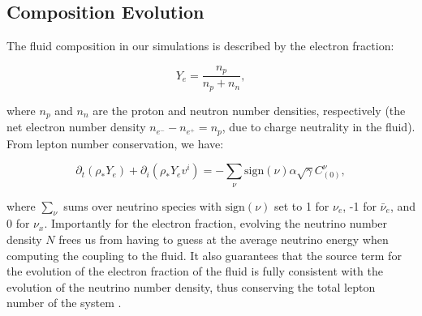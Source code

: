 \subsection{Composition Evolution}

The fluid composition in our simulations is described by the electron fraction:

\begin{equation}
  Y_e = \frac{n_p}{n_p + n_n},
\end{equation}

where $n_p$ and $n_n$ are the proton and neutron number densities, respectively (the net electron number density $n_{e^{-}} - n_{e^{+}} = n_p$, due to charge neutrality in the fluid). From lepton number conservation, we have:

\begin{equation}
  \partial_t \left(\rho_* Y_e \right) + \partial_i\left(\rho_*Y_e v^i\right)= -\sum_{\nu}\textrm{sign}(\nu)\alpha \sqrt{\gamma} C^{\nu}_{(0)},
\end{equation}

where $\sum_{\nu}$ sums over neutrino species with $\textrm{sign}(\nu)$ set to 1 for $\nu_e$, -1 for $\bar \nu_e$, and 0 for $\nu_x$. Importantly for the electron fraction, evolving the neutrino number density $N$ frees us from having to guess at the average neutrino energy when computing the coupling to the fluid. It also guarantees that the source term for the evolution of the electron fraction of the fluid is fully consistent with the evolution of the neutrino number density, thus conserving the total lepton number of the system \cite{foucart2016impact}. 

